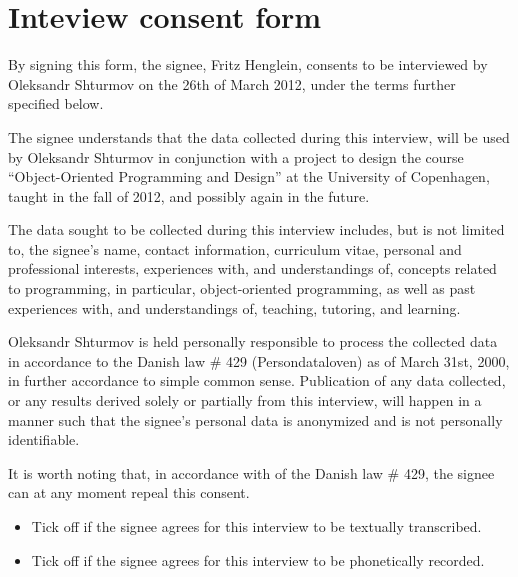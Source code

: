 \section*{Inteview consent form}

\vspace{1in}

\renewcommand{\staticDate}{March 26th 2012}

By signing this form, the signee, Fritz Henglein,  consents to be interviewed
by Oleksandr Shturmov on the 26th of March 2012, under the terms further
specified below.

The signee understands that the data collected during this interview, will
be used by Oleksandr Shturmov in conjunction with a project to design the
course ``Object-Oriented Programming and Design'' at the University of
Copenhagen, taught in the fall of 2012, and possibly again in the future. 

The data sought to be collected during this interview includes, but is not
limited to, the signee's name, contact information, curriculum vitae,
personal and professional interests, experiences with, and understandings of,
concepts related to programming, in particular, object-oriented programming, as
well as past experiences with, and understandings of, teaching, tutoring, and
learning. 

Oleksandr Shturmov is held personally responsible to process the collected data
in accordance to the Danish law \# 429 (Persondataloven) as of March 31st,
2000, in further accordance to simple common sense. Publication of any data
collected, or any results derived solely or partially from this interview, will
happen in a manner such that the signee's personal data is anonymized and is
not personally identifiable.

It is worth noting that, in accordance with  of the Danish law
\# 429, the signee can at any moment repeal this consent.

\renewcommand{\labelitemi}{$\Box$}

\begin{itemize}

\item Tick off if the signee agrees for this interview to be textually transcribed.

\item Tick off if the signee agrees for this interview to be phonetically recorded.

\end{itemize}

